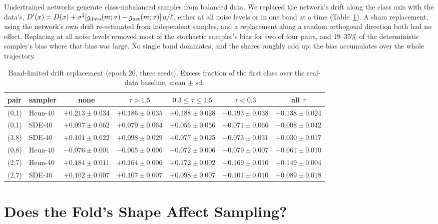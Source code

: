 Undertrained networks generate class-imbalanced samples from balanced data. We replaced the network's drift along the class axis with the data's, $D'(x)=D(x)+\sigma^2[g_{\rm data}(m;\sigma)-g_{\rm net}(m;\sigma)]\,u/\ell$, either at all noise levels or in one band at a time (Table~\ref{tab:bands}). A sham replacement, using the network's own drift re-estimated from independent samples, and a replacement along a random orthogonal direction both had no effect. Replacing at all noise levels removed most of the stochastic sampler's bias for two of four pairs, and 19--35\% of the deterministic sampler's bias where that bias was large. No single band dominates, and the shares roughly add up: the bias accumulates over the whole trajectory.

\begin{table}[h]
\centering
\caption{Band-limited drift replacement (epoch 20, three seeds). Excess fraction of the first class over the real-data baseline, mean $\pm$ sd.}
\label{tab:bands}
\footnotesize\setlength{\tabcolsep}{4pt}
\begin{tabular}{llccccc}
\toprule
pair & sampler & none & $\tau>1.5$ & $0.3\le\tau\le1.5$ & $\tau<0.3$ & all $\tau$ \\
\midrule
(0,1) & Heun-40 & $+0.213\pm0.034$ & $+0.186\pm0.035$ & $+0.188\pm0.028$ & $+0.193\pm0.038$ & $+0.138\pm0.024$ \\
(0,1) & SDE-40 & $+0.097\pm0.062$ & $+0.079\pm0.064$ & $+0.056\pm0.056$ & $+0.071\pm0.066$ & $-0.008\pm0.042$ \\
(3,8) & SDE-40 & $+0.101\pm0.022$ & $+0.098\pm0.029$ & $+0.077\pm0.025$ & $+0.073\pm0.031$ & $+0.030\pm0.017$ \\
(0,8) & Heun-40 & $-0.076\pm0.001$ & $-0.065\pm0.006$ & $-0.072\pm0.006$ & $-0.079\pm0.007$ & $-0.061\pm0.010$ \\
(2,7) & Heun-40 & $+0.184\pm0.011$ & $+0.164\pm0.006$ & $+0.172\pm0.002$ & $+0.169\pm0.010$ & $+0.149\pm0.004$ \\
(2,7) & SDE-40 & $+0.102\pm0.007$ & $+0.107\pm0.007$ & $+0.098\pm0.007$ & $+0.101\pm0.010$ & $+0.089\pm0.018$ \\
\bottomrule
\end{tabular}
\end{table}

\section{Does the Fold's Shape Affect Sampling?}
\label{app:sampling}

